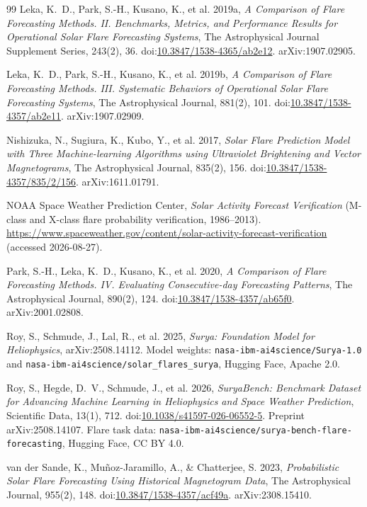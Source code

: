 \documentclass[11pt]{article}
\newcommand{\code}[1]{\texttt{#1}}
\newcommand{\doi}[1]{doi:\href{https://doi.org/#1}{#1}}
\begin{document}
\begin{thebibliography}{99}
Leka, K.~D., Park, S.-H., Kusano, K., et al. 2019a,
\emph{A Comparison of Flare Forecasting Methods. II. Benchmarks, Metrics, and
Performance Results for Operational Solar Flare Forecasting Systems},
The Astrophysical Journal Supplement Series, 243(2), 36.
\doi{10.3847/1538-4365/ab2e12}. arXiv:1907.02905.

Leka, K.~D., Park, S.-H., Kusano, K., et al. 2019b,
\emph{A Comparison of Flare Forecasting Methods. III. Systematic Behaviors of
Operational Solar Flare Forecasting Systems},
The Astrophysical Journal, 881(2), 101.
\doi{10.3847/1538-4357/ab2e11}. arXiv:1907.02909.

Nishizuka, N., Sugiura, K., Kubo, Y., et al. 2017,
\emph{Solar Flare Prediction Model with Three Machine-learning Algorithms using
Ultraviolet Brightening and Vector Magnetograms},
The Astrophysical Journal, 835(2), 156. \doi{10.3847/1538-4357/835/2/156}.
arXiv:1611.01791.

NOAA Space Weather Prediction Center,
\emph{Solar Activity Forecast Verification} (M-class and X-class flare
probability verification, 1986--2013).
\url{https://www.spaceweather.gov/content/solar-activity-forecast-verification}
(accessed 2026-08-27).

Park, S.-H., Leka, K.~D., Kusano, K., et al. 2020,
\emph{A Comparison of Flare Forecasting Methods. IV. Evaluating Consecutive-day
Forecasting Patterns},
The Astrophysical Journal, 890(2), 124.
\doi{10.3847/1538-4357/ab65f0}. arXiv:2001.02808.

Roy, S., Schmude, J., Lal, R., et al. 2025,
\emph{Surya: Foundation Model for Heliophysics}, arXiv:2508.14112.
Model weights: \code{nasa-ibm-ai4science/Surya-1.0} and
\code{nasa-ibm-ai4science/solar\_flares\_surya}, Hugging Face, Apache 2.0.

Roy, S., Hegde, D.~V., Schmude, J., et al. 2026,
\emph{SuryaBench: Benchmark Dataset for Advancing Machine Learning in
Heliophysics and Space Weather Prediction},
Scientific Data, 13(1), 712. \doi{10.1038/s41597-026-06552-5}.
Preprint arXiv:2508.14107. Flare task data:
\code{nasa-ibm-ai4science/surya-bench-flare-forecasting}, Hugging Face, CC BY 4.0.

van der Sande, K., Mu\~{n}oz-Jaramillo, A., \& Chatterjee, S. 2023,
\emph{Probabilistic Solar Flare Forecasting Using Historical Magnetogram Data},
The Astrophysical Journal, 955(2), 148. \doi{10.3847/1538-4357/acf49a}.
arXiv:2308.15410.

\end{thebibliography}
\end{document}
